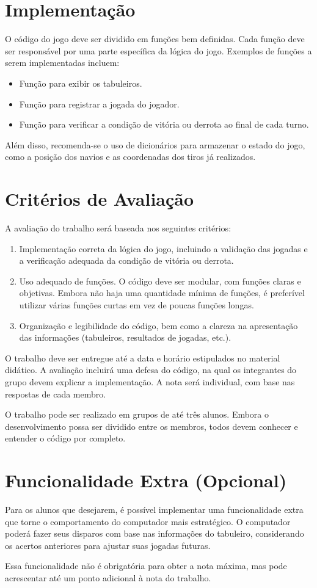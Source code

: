 \documentclass[12pt]{article}
\begin{document}
\section*{Implementação}

O código do jogo deve ser dividido em funções bem definidas. Cada função deve ser responsável por uma parte específica da lógica do jogo. Exemplos de funções a serem implementadas incluem:
\begin{itemize}
  \item Função para exibir os tabuleiros.
  \item Função para registrar a jogada do jogador.
  \item Função para verificar a condição de vitória ou derrota ao final de cada turno.
\end{itemize}

Além disso, recomenda-se o uso de dicionários para armazenar o estado do jogo, como a posição dos navios e as coordenadas dos tiros já realizados.

\section*{Critérios de Avaliação}

A avaliação do trabalho será baseada nos seguintes critérios:
\begin{enumerate}
  \item Implementação correta da lógica do jogo, incluindo a validação das jogadas e a verificação adequada da condição de vitória ou derrota.
  \item Uso adequado de funções. O código deve ser modular, com funções claras e objetivas. Embora não haja uma quantidade mínima de funções, é preferível utilizar várias funções curtas em vez de poucas funções longas.
  \item Organização e legibilidade do código, bem como a clareza na apresentação das informações (tabuleiros, resultados de jogadas, etc.).
\end{enumerate}

O trabalho deve ser entregue até a data e horário estipulados no material didático. A avaliação incluirá uma defesa do código, na qual os integrantes do grupo devem explicar a implementação. A nota será individual, com base nas respostas de cada membro.

O trabalho pode ser realizado em grupos de até três alunos. Embora o desenvolvimento possa ser dividido entre os membros, todos devem conhecer e entender o código por completo.

\section*{Funcionalidade Extra (Opcional)}

Para os alunos que desejarem, é possível implementar uma funcionalidade extra que torne o comportamento do computador mais estratégico. O computador poderá fazer seus disparos com base nas informações do tabuleiro, considerando os acertos anteriores para ajustar suas jogadas futuras.

Essa funcionalidade não é obrigatória para obter a nota máxima, mas pode acrescentar até um ponto adicional à nota do trabalho.
\end{document}
